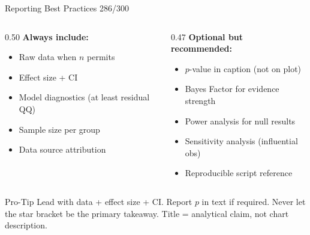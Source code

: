 \documentclass[10pt]{beamer}
\newcommand{\smark}[1]{\hfill{\scriptsize\color{codegray}#1}}
\begin{document}
\begin{frame}{Reporting Best Practices}
\smark{286/300}
\begin{columns}[T]
\begin{column}{0.50\textwidth}
    \textbf{Always include:}
    \begin{itemize}
        \item Raw data when $n$ permits
        \item Effect size + CI
        \item Model diagnostics (at least residual QQ)
        \item Sample size per group
        \item Data source attribution
    \end{itemize}
\end{column}
\begin{column}{0.47\textwidth}
    \textbf{Optional but recommended:}
    \begin{itemize}
        \item $p$-value in caption (not on plot)
        \item Bayes Factor for evidence strength
        \item Power analysis for null results
        \item Sensitivity analysis (influential obs)
        \item Reproducible script reference
    \end{itemize}
\end{column}
\end{columns}

\vspace{0.3cm}
\begin{alertblock}{Pro-Tip}
    \scriptsize Lead with data + effect size + CI. Report $p$ in text if required. Never let the star bracket be the primary takeaway. Title = analytical claim, not chart description.
\end{alertblock}
\end{frame}
\end{document}
